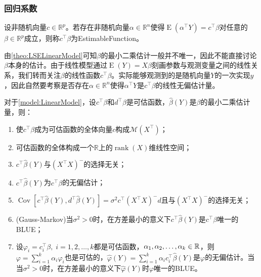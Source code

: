 \subsubsection{回归系数}
\begin{definition}
	设非随机向量$c\in\mathbb{R}^{p}$。若存在非随机向量$\alpha\in\mathbb{R}^{n}$使得$\operatorname{E}(\alpha^{\top}Y)=c^{\top}\beta$对任意的$\beta\in\mathbb{R}^{p}$成立，则称$c^{\top}\beta$为\gls{EstimableFunction}。
\end{definition}
\begin{note}
	由\cref{theo:LSELinearModel}可知$\beta$的最小二乘估计一般并不唯一，因此不能直接讨论$\beta$本身的估计。由于线性模型通过$\operatorname{E}(Y)=X\beta$刻画参数与观测变量之间的线性关系，我们转而关注$\beta$的线性函数$c^{\top}\beta$。实际能够观测到的是随机向量$Y$的一次实现$y$，因此自然要考察是否存在$\alpha\in\mathbb{R}^{n}$使得$\alpha^{\top}Y$是$c^{\top}\beta$的线性无偏估计量。
\end{note}
\begin{property}\label{prop:EstimableFunction}
	对于\cref{model:LinearModel}，设$c^{\top}\beta$和$d^{\top}\beta$是可估函数，$\hat{\beta}(Y)$是$\beta$的最小二乘估计量，则：
	\begin{enumerate}
		\item 使$c^{\top}\beta$成为可估函数的全体向量$c$构成$\mathcal{M}(X^{\top})$；
		\item 可估函数的全体构成一个$\mathbb{R}$上的$\operatorname{rank}(X)$维线性空间；
		\item $c^{\top}\hat{\beta}(Y)$与$(X^{\top}X)^-$的选择无关；
		\item $c^{\top}\hat{\beta}(Y)$为$c^{\top}\beta$的无偏估计；
		\item  $\operatorname{Cov}[c^{\top}\hat{\beta}(Y),d^{\top}\hat{\beta}(Y)]=\sigma^2c^{\top}(X^{\top}X)^-d$且与$(X^{\top}X)^-$的选择无关；
		\item (Gauss-Markov)当$\sigma^2>0$时，在方差最小的意义下$c^{\top}\hat{\beta}(Y)$是$c^{\top}\beta$唯一的BLUE；
		\item 设$\varphi_i=c_i^{\top}\beta,\;i=1,2,\dots,k$都是可估函数，$\alpha_1, \alpha_2, \dots, \alpha_{k}\in\mathbb{R}$，则$\varphi=\sum\limits_{i=1}^{k}\alpha_i\varphi_i$也是可估的，$\hat{\varphi}(Y)=\sum\limits_{i=1}^{k}\alpha_ic_i^{\top}\hat{\beta}(Y)$是$\varphi$的无偏估计。当当$\sigma^2>0$时，在方差最小的意义下$\hat{\varphi}(Y)$时$\varphi$唯一的BLUE。
	\end{enumerate}
\end{property}
